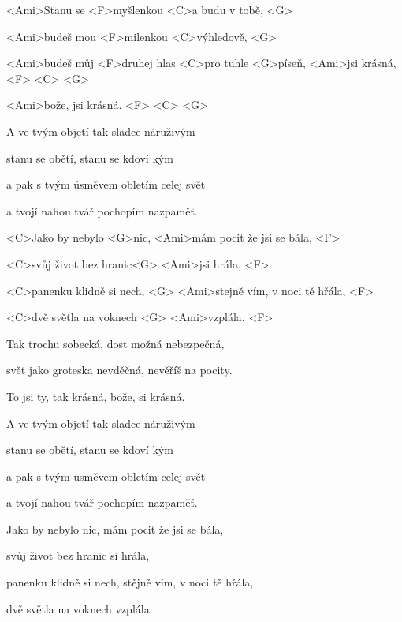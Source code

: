 

\zs
<Ami>Stanu se <F>myšlenkou <C>a budu v tobě, <G>

<Ami>budeš mou <F>milenkou <C>výhledově, <G>

<Ami>budeš můj <F>druhej hlas <C>pro tuhle <G>píseň, 
<Ami>jsi krásná, <F> <C> <G>

<Ami>bože, jsi krásná. <F> <C> <G>
\ks

\zs
A ve tvým objetí tak sladce náruživým

stanu se obětí, stanu se kdoví kým

a pak s tvým úsměvem obletím celej svět

a tvojí nahou tvář pochopím nazpaměť.
\ks

\zr
<C>Jako by nebylo <G>nic, <Ami>mám pocit že jsi se bála, <F>

<C>svůj život bez hranic<G> <Ami>jsi hrála, <F>

<C>panenku klidně si nech, <G> <Ami>stejně vím, v noci tě hřála, <F>

<C>dvě světla na voknech <G> <Ami>vzplála. <F>
\kr

\zs
Tak trochu sobecká, dost možná nebezpečná,

svět jako groteska nevděčná, nevěříš na pocity.

To jsi ty, tak krásná, bože, si krásná.



A ve tvým objetí tak sladce náruživým

stanu se obětí, stanu se kdoví kým

a pak s tvým usměvem obletím celej svět

a tvojí nahou tvář pochopím nazpaměť.
\ks


\zr
Jako by nebylo nic, mám pocit že jsi se bála,

svůj život bez hranic si hrála,

panenku klidně si nech, stějně vím, v noci tě hřála,

dvě světla na voknech vzplála.
\kr
\kp
